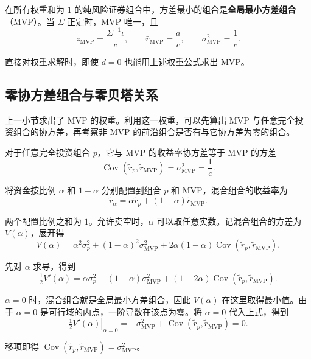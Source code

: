 \begin{tcolorbox}[knowledge]
\label{res:wj-twelve-mvp}
在所有权重和为 $1$ 的纯风险证券组合中，方差最小的组合是\textbf{全局最小方差组合}（MVP）。当 $\Sigma$ 正定时，MVP 唯一，且
\[
 z_{\mathrm{MVP}}=\frac{\Sigma^{-1}\iota}{c},\qquad
 \bar r_{\mathrm{MVP}}=\frac ac,\qquad
 \sigma_{\mathrm{MVP}}^2=\frac1c.
\]
\end{tcolorbox}

直接对权重求解时，即使 $d=0$ 也能用上述权重公式求出 MVP。

\subsection{零协方差组合与零贝塔关系}
上一小节求出了 MVP 的权重。利用这一权重，可以先算出 MVP 与任意完全投资组合的协方差，再考察非 MVP 的前沿组合是否有与它协方差为零的组合。

\begin{tcolorbox}[knowledge]
 对于任意完全投资组合 $p$，它与 MVP 的收益率协方差等于 MVP 的方差
\[
 \operatorname{Cov}(\widetilde r_p,\widetilde r_{\mathrm{MVP}})=\sigma_{\mathrm{MVP}}^2=\frac{1}{c}.
\]
\end{tcolorbox}

\begin{solution}[label-content={证明一（教材的混合法）},blank-type=none]
将资金按比例 $\alpha$ 和 $1-\alpha$ 分别配置到组合 $p$ 和 MVP，混合组合的收益率为
\[
 \widetilde r_\alpha=\alpha\widetilde r_p+(1-\alpha)\widetilde r_{\mathrm{MVP}}.
\]

两个配置比例之和为 $1$。允许卖空时，$\alpha$ 可以取任意实数。记混合组合的方差为 $V(\alpha)$，展开得
\[
 V(\alpha)
 =\alpha^2\sigma_p^2+(1-\alpha)^2\sigma_{\mathrm{MVP}}^2+2\alpha(1-\alpha)
 \operatorname{Cov}(\widetilde r_p,\widetilde r_{\mathrm{MVP}}).
\]

先对 $\alpha$ 求导，得到
\[
 \tfrac12 V'(\alpha)
 =\alpha\sigma_p^2-(1-\alpha)\sigma_{\mathrm{MVP}}^2
  +(1-2\alpha)\operatorname{Cov}(\widetilde r_p,\widetilde r_{\mathrm{MVP}}).
\]

$\alpha=0$ 时，混合组合就是全局最小方差组合，因此 $V(\alpha)$ 在这里取得最小值。由于 $\alpha=0$ 是可行域的内点，一阶导数在该点为零。将 $\alpha=0$ 代入上式，得到
\[
 \left.\tfrac12 V'(\alpha)\right|_{\alpha=0}
 =-\sigma_{\mathrm{MVP}}^2
  +\operatorname{Cov}(\widetilde r_p,\widetilde r_{\mathrm{MVP}})=0.
\]

移项即得 $\operatorname{Cov}(\widetilde r_p,\widetilde r_{\mathrm{MVP}})=\sigma_{\mathrm{MVP}}^2$。
\end{solution}

